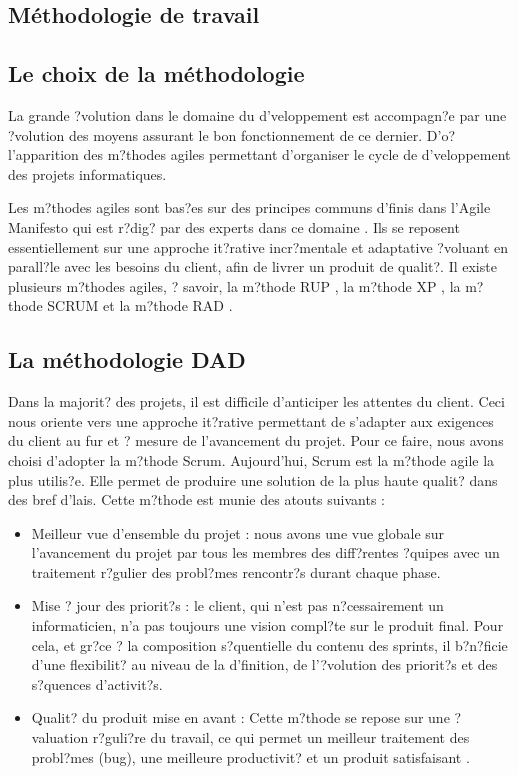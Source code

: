 \begin{spacing}{1.5}
\section{Méthodologie de travail}
\subsection{Le choix de la méthodologie}
La grande ?volution dans le domaine du d'veloppement est accompagn?e par une ?volution des moyens assurant le bon fonctionnement de ce dernier. D'o? l'apparition des m?thodes agiles permettant d'organiser le cycle de d'veloppement des projets informatiques.

Les m?thodes agiles sont bas?es sur des principes communs d'finis dans l'Agile Manifesto qui est r?dig? par des experts dans ce domaine \cite{AgManifesto}. Ils se reposent essentiellement sur une approche it?rative incr?mentale et adaptative ?voluant en parall?le avec les besoins du client, afin de livrer un produit de qualit?.
Il existe plusieurs m?thodes agiles, ? savoir, la m?thode  RUP \cite{RUP}, la m?thode XP \cite{XP}, la m?thode SCRUM \cite{SCRUM} et la m?thode RAD \cite{RAD}.

\subsection{La méthodologie DAD}
Dans la majorit? des projets, il est difficile d'anticiper les attentes du client. Ceci nous oriente vers une approche it?rative permettant de s'adapter aux exigences du client au fur et ? mesure de l'avancement du projet. Pour ce faire, nous avons choisi d'adopter la m?thode Scrum.
Aujourd'hui, Scrum est la m?thode agile la plus utilis?e. Elle permet de produire une solution de la plus haute qualit? dans des bref d'lais.
Cette m?thode est munie des atouts suivants :
\begin{itemize}
  \item Meilleur vue d'ensemble du projet : nous avons une vue globale sur l'avancement du projet par tous les membres des diff?rentes ?quipes avec un traitement r?gulier des probl?mes rencontr?s durant chaque phase.
  \item Mise ? jour des priorit?s : le client, qui n'est pas n?cessairement un informaticien, n'a pas toujours une vision compl?te sur le produit final. Pour cela, et gr?ce ? la composition s?quentielle du contenu des sprints, il b?n?ficie d'une flexibilit? au niveau de la d'finition, de l'?volution des priorit?s et des s?quences d'activit?s.
  \item Qualit? du produit mise en avant : Cette m?thode se repose sur une ?valuation r?guli?re du travail, ce qui permet un meilleur traitement des probl?mes (bug), une meilleure productivit? et un produit satisfaisant \cite{AvantageScrum}.
\end{itemize}


\end{spacing}
